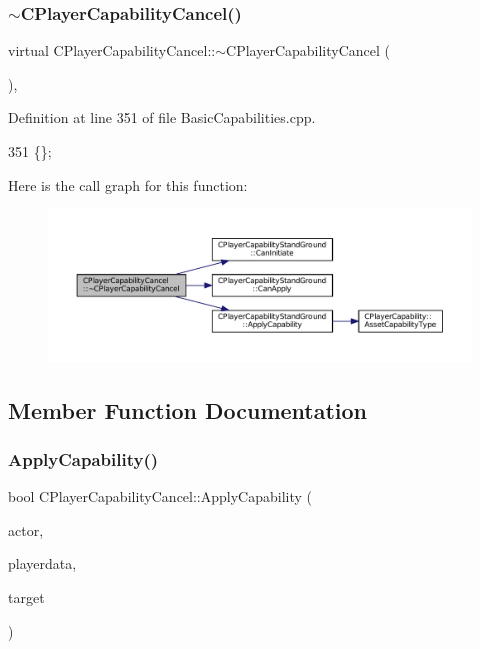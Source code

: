 \subsubsection{\texorpdfstring{$\sim$\+C\+Player\+Capability\+Cancel()}{~CPlayerCapabilityCancel()}}
{\footnotesize\ttfamily virtual C\+Player\+Capability\+Cancel\+::$\sim$\+C\+Player\+Capability\+Cancel (\begin{DoxyParamCaption}{ }\end{DoxyParamCaption})\hspace{0.3cm}{\ttfamily [inline]}, {\ttfamily [virtual]}}



Definition at line 351 of file Basic\+Capabilities.\+cpp.


\begin{DoxyCode}
351 \{\};
\end{DoxyCode}
Here is the call graph for this function\+:
\nopagebreak
\begin{figure}[H]
\begin{center}
\leavevmode
\includegraphics[width=350pt]{classCPlayerCapabilityCancel_a354db8bd423b9bf6959de288177db049_cgraph}
\end{center}
\end{figure}


\subsection{Member Function Documentation}
\hypertarget{classCPlayerCapabilityCancel_a8f738ac375bf5d1e7f8b768bce16b946}{}\label{classCPlayerCapabilityCancel_a8f738ac375bf5d1e7f8b768bce16b946} 
\subsubsection{\texorpdfstring{Apply\+Capability()}{ApplyCapability()}}
{\footnotesize\ttfamily bool C\+Player\+Capability\+Cancel\+::\+Apply\+Capability (\begin{DoxyParamCaption}\item[{std\+::shared\+\_\+ptr$<$ \hyperlink{classCPlayerAsset}{C\+Player\+Asset} $>$}]{actor,  }\item[{std\+::shared\+\_\+ptr$<$ \hyperlink{classCPlayerData}{C\+Player\+Data} $>$}]{playerdata,  }\item[{std\+::shared\+\_\+ptr$<$ \hyperlink{classCPlayerAsset}{C\+Player\+Asset} $>$}]{target }\end{DoxyParamCaption})\hspace{0.3cm}{\ttfamily [virtual]}}



